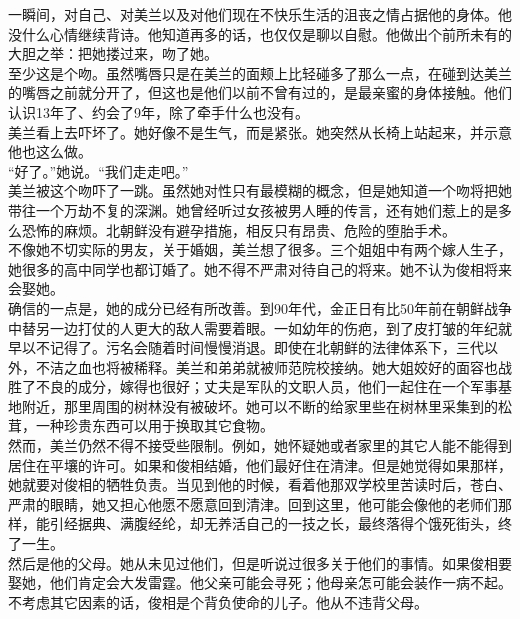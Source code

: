 一瞬间，对自己、对美兰以及对他们现在不快乐生活的沮丧之情占据他的身体。他没什么心情继续背诗。他知道再多的话，也仅仅是聊以自慰。他做出个前所未有的大胆之举：把她搂过来，吻了她。\\

至少这是个吻。虽然嘴唇只是在美兰的面颊上比轻碰多了那么一点，在碰到达美兰的嘴唇之前就分开了，但这也是他们以前不曾有过的，是最亲蜜的身体接触。他们认识13年了、约会了9年，除了牵手什么也没有。\\

美兰看上去吓坏了。她好像不是生气，而是紧张。她突然从长椅上站起来，并示意他也这么做。\\

“好了。”她说。“我们走走吧。”\\

美兰被这个吻吓了一跳。虽然她对性只有最模糊的概念，但是她知道一个吻将把她带往一个万劫不复的深渊。她曾经听过女孩被男人睡的传言，还有她们惹上的是多么恐怖的麻烦。北朝鲜没有避孕措施，相反只有昂贵、危险的堕胎手术。\\

不像她不切实际的男友，关于婚姻，美兰想了很多。三个姐姐中有两个嫁人生子，她很多的高中同学也都订婚了。她不得不严肃对待自己的将来。她不认为俊相将来会娶她。\\

确信的一点是，她的成分已经有所改善。到90年代，金正日有比50年前在朝鲜战争中替另一边打仗的人更大的敌人需要着眼。一如幼年的伤疤，到了皮打皱的年纪就早以不记得了。污名会随着时间慢慢消退。即使在北朝鲜的法律体系下，三代以外，不洁之血也将被稀释。美兰和弟弟就被师范院校接纳。她大姐姣好的面容也战胜了不良的成分，嫁得也很好；丈夫是军队的文职人员，他们一起住在一个军事基地附近，那里周围的树林没有被破坏。她可以不断的给家里些在树林里采集到的松茸，一种珍贵东西可以用于换取其它食物。\\

然而，美兰仍然不得不接受些限制。例如，她怀疑她或者家里的其它人能不能得到居住在平壤的许可。如果和俊相结婚，他们最好住在清津。但是她觉得如果那样，她就要对俊相的牺牲负责。当见到他的时候，看着他那双学校里苦读时后，苍白、严肃的眼睛，她又担心他愿不愿意回到清津。回到这里，他可能会像他的老师们那样，能引经据典、满腹经纶，却无养活自己的一技之长，最终落得个饿死街头，终了一生。\\

然后是他的父母。她从未见过他们，但是听说过很多关于他们的事情。如果俊相要娶她，他们肯定会大发雷霆。他父亲可能会寻死；他母亲怎可能会装作一病不起。不考虑其它因素的话，俊相是个背负使命的儿子。他从不违背父母。\\

